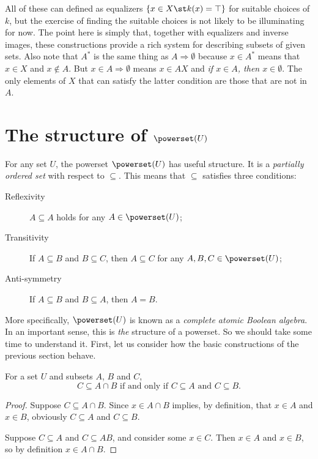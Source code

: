 All of these can defined as equalizers $\{x\in X\st k(x)=\top\}$ for suitable choices of $k$, but the exercise of finding the suitable choices is not likely to be illuminating for now. 
The point here is simply that, together with equalizers and inverse images, these constructions provide a rich system for describing subsets of given sets. Also note that $A^*$ is the same thing as $A\Rightarrow\emptyset$ because $x\in A^*$ 
means that $x\in X$ and $x\notin A$. But $x\in A\Rightarrow \emptyset$ 
means $x\in AX$ and \emph{if $x\in A$, then $x\in\emptyset$}. The only elements
of $X$ that can satisfy the latter condition are those that are not in $A$.

\section{The structure of $\powerset(U)$}
  
For any set $U$, the powerset $\powerset(U)$ has useful structure. It is a \emph{partially ordered set} with respect to $\subseteq$. This means that 
$\subseteq$ satisfies three conditions:
\begin{description}
	\item[Reflexivity] $A\subseteq A$ holds for any $A\in \powerset(U)$;
	\item[Transitivity] If $A\subseteq B$ and $B\subseteq C$, then $A\subseteq C$ for any $A,B,C\in\powerset(U)$;
	\item[Anti-symmetry] If $A\subseteq B$ and $B\subseteq A$, then $A=B$. 
\end{description}

More specifically, $\powerset(U)$ is known as a \emph{complete atomic Boolean algebra}. In an important sense, this is \emph{the} structure of a powerset. So we
should take some time to understand it. First, let us consider how the basic
constructions of the previous section behave.

\begin{lemma}
	For a set $U$ and subsets $A$, $B$ and $C$,
\[\text{$C\subseteq A\cap B$ if and only if $C\subseteq A$ and $C\subseteq B$.}\]
	
	\begin{proof}
		Suppose $C\subseteq A\cap B$.
		Since $x\in A\cap B$ implies, by definition,
		that $x\in A$ and $x\in B$, obviously $C\subseteq A$ and $C\subseteq B$.
		
		Suppose $C\subseteq A$ and $C\subseteq AB$, and consider some $x\in C$.
		Then $x\in A$ and $x\in B$, so by definition $x\in A\cap B$.
	\end{proof}
\end{lemma}

